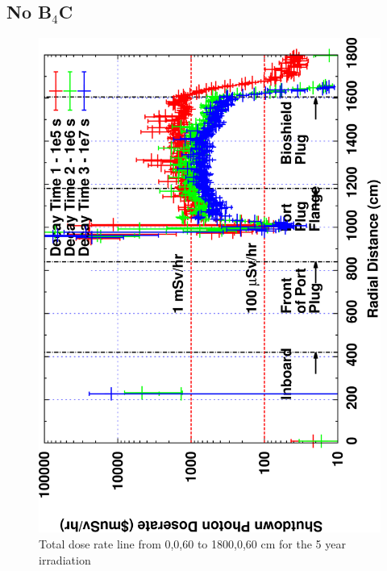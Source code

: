 \documentclass[12pt]{article}
\begin{document}
\subsection{No B$_4$C}
\begin{figure}[ht!]
\centering
\includegraphics[clip,scale=0.12,angle=-90]{../plots/photon_lineout/5yr/no-b4c_5yr.png}
\caption{Total dose rate line from 0,0,60 to 1800,0,60 cm for the 5 year irradiation}
\label{fig:photons_5y_nob4c_dose}
\end{figure}
\end{document}
